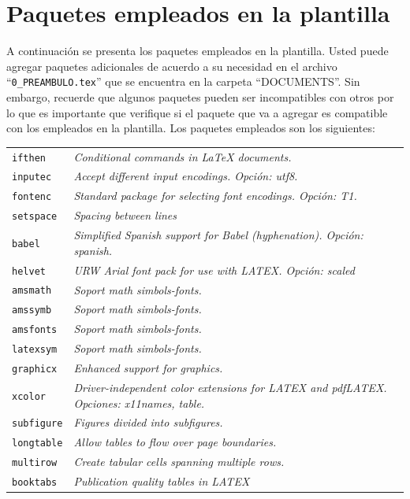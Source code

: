 \section{Paquetes empleados en la plantilla}

A continuación se presenta los paquetes empleados en la plantilla. Usted puede agregar paquetes adicionales de acuerdo a su necesidad en el archivo ``\lstinline|0_PREAMBULO.tex|'' que se encuentra en la carpeta ``DOCUMENTS''. Sin embargo, recuerde que algunos paquetes pueden ser incompatibles con otros por lo que es importante que verifique si el paquete que va a agregar es compatible con los empleados en la plantilla. Los paquetes empleados son los siguientes: 

\begin{longtable}{p{} p{}}
	\texttt{ifthen}  	& \textit{Conditional commands in LaTeX documents.}  \\  
	\texttt{inputec} 	& \textit{Accept different input encodings. Opción: utf8.} \\ 
	\texttt{fontenc} 	& \textit{Standard package for selecting font encodings. Opción: T1.} \\
	\texttt{setspace}   & \textit{Spacing between lines} \\ 
	\texttt{babel} 	 	& \textit{Simplified Spanish support for Babel (hyphenation). Opción: spanish.} \\
	\texttt{helvet}  	& \textit{URW Arial font pack for use with LATEX. Opción: scaled}\\
	\texttt{amsmath} 	& \textit{Soport math simbols-fonts.} \\
	\texttt{amssymb}    & \textit{Soport math simbols-fonts.}\\
	\texttt{amsfonts} 	& \textit{Soport math simbols-fonts.}\\
	\texttt{latexsym} 	& \textit{Soport math simbols-fonts.}\\
	\texttt{graphicx} 	& \textit{Enhanced support for graphics.}\\
	\texttt{xcolor} 	& \textit{Driver-independent color extensions for LATEX and pdfLATEX. Opciones: x11names, table.} \\
	\texttt{subfigure} 	& \textit{Figures divided into subfigures.} \\
	\texttt{longtable} 	& \textit{Allow tables to flow over page boundaries.} \\
	\texttt{multirow}  	& \textit{Create tabular cells spanning multiple rows.} \\
	\texttt{booktabs} 	& \textit{Publication quality tables in LATEX} \\

\end{longtable}
